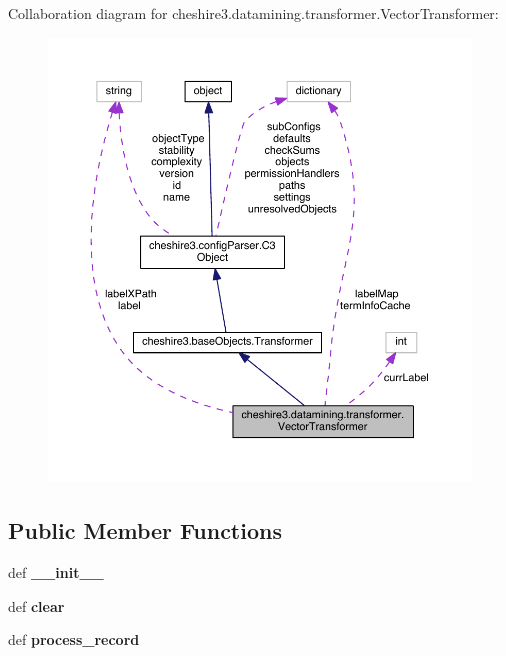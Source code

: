 Collaboration diagram for cheshire3.\-datamining.\-transformer.\-Vector\-Transformer\-:
\nopagebreak
\begin{figure}[H]
\begin{center}
\leavevmode
\includegraphics[width=350pt]{classcheshire3_1_1datamining_1_1transformer_1_1_vector_transformer__coll__graph}
\end{center}
\end{figure}
\subsection*{Public Member Functions}
\begin{DoxyCompactItemize}
\item 
\hypertarget{classcheshire3_1_1datamining_1_1transformer_1_1_vector_transformer_a2dcd6c84cef5c9c3c8e68b0072da2a12}{def {\bfseries \-\_\-\-\_\-init\-\_\-\-\_\-}}\label{classcheshire3_1_1datamining_1_1transformer_1_1_vector_transformer_a2dcd6c84cef5c9c3c8e68b0072da2a12}

\item 
\hypertarget{classcheshire3_1_1datamining_1_1transformer_1_1_vector_transformer_a4680e0c4bc4c696c6365ceb3789525c9}{def {\bfseries clear}}\label{classcheshire3_1_1datamining_1_1transformer_1_1_vector_transformer_a4680e0c4bc4c696c6365ceb3789525c9}

\item 
\hypertarget{classcheshire3_1_1datamining_1_1transformer_1_1_vector_transformer_aae745a92ed124ccba22ab8dc46ac5edb}{def {\bfseries process\-\_\-record}}\label{classcheshire3_1_1datamining_1_1transformer_1_1_vector_transformer_aae745a92ed124ccba22ab8dc46ac5edb}

\end{DoxyCompactItemize}
